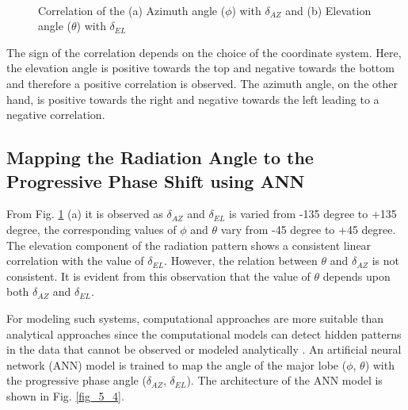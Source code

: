 \begin{figure}
  \centering
   ~~~
  \\
  \caption{Correlation of the (a) Azimuth angle ($\phi$) with $\delta_{AZ}$ and (b) Elevation angle ($\theta$) with $\delta_{EL}$} \label{fig_5_3}
\end{figure}

The sign of the correlation depends on the choice of the coordinate system. Here, the elevation angle is positive towards the top and negative towards the bottom and therefore a positive correlation is observed. The azimuth angle, on the other hand, is positive towards the right and negative towards the left leading to a negative correlation.

\subsection{Mapping the Radiation Angle to the Progressive Phase Shift using ANN}
From Fig. \ref{fig_5_3} (a) it is observed as $\delta_{AZ}$ and $\delta_{EL}$ is varied from -135 degree to +135 degree, the corresponding values of $\phi$ and $\theta$ vary from -45 degree to +45 degree. The elevation component of the radiation pattern shows a consistent linear correlation with the value of $\delta_{EL}$. However, the relation between $\theta$ and $\delta_{AZ}$ is not consistent. It is evident from this observation that the value of $\theta$ depends upon both $\delta_{AZ}$ and $\delta_{EL}$.

For modeling such systems, computational approaches are more suitable than analytical approaches since the computational models can detect hidden patterns in the data that cannot be observed or modeled analytically \cite{simDrivOptBook}. An artificial neural network (ANN) model is trained to map the angle of the major lobe ($\phi$, $\theta$) with the progressive phase angle ($\delta_{AZ}$, $\delta_{EL}$). The architecture of the ANN model is shown in Fig. \ref{fig_5_4}.

